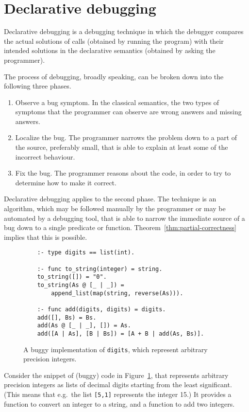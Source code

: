 \section{Declarative debugging}
\label{sec:decl-debug}

Declarative debugging is a debugging technique
in which the debugger compares the actual solutions of calls
(obtained by running the program)
with their intended solutions in the declarative semantics
(obtained by asking the programmer).

The process of debugging, broadly speaking,
can be broken down into the following three phases.
\begin{enumerate}
\item
Observe a bug symptom.
In the classical semantics,
the two types of symptoms that the programmer can observe
are wrong answers and missing answers.
\item
Localize the bug.
The programmer narrows the problem down to a part of the source,
preferably small,
that is able to explain at least some of the incorrect behaviour.
\item
Fix the bug.
The programmer reasons about the code,
in order to try to determine how to make it correct.
\end{enumerate}
Declarative debugging applies to the second phase.
The technique is an algorithm,
which may be followed manually by the programmer
or may be automated by a debugging tool,
that is able to narrow the immediate source of a bug
down to a single predicate or function.
Theorem~\ref{thm:partial-correctness} implies that this is possible.

\begin{figure}[htb]
\begin{verbatim}
    :- type digits == list(int).

    :- func to_string(integer) = string.
    to_string([]) = "0".
    to_string(As @ [_ | _]) =
        append_list(map(string, reverse(As))).

    :- func add(digits, digits) = digits.
    add([], Bs) = Bs.
    add(As @ [_ | _], []) = As.
    add([A | As], [B | Bs]) = [A + B | add(As, Bs)].
\end{verbatim}
\caption{
A buggy implementation of \texttt{digits},
which represent arbitrary precision integers.
\label{fig:buggy-ints}}
\end{figure}

Consider the snippet of (buggy) code in Figure~\ref{fig:buggy-ints},
that represents arbitrary precision integers
as lists of decimal digits
starting from the least significant.
(This means that e.g.\ the list \texttt{[5,1]} represents the integer 15.)
It provides a function
to convert an integer to a string,
and a function to add two integers.

